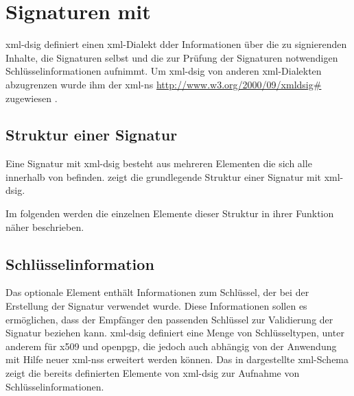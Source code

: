 
\chapter{Signaturen mit }
\label{chap:XML-DSig}
\gls{xml-dsig} definiert einen \gls{xml}-Dialekt dder Informationen über die zu signierenden Inhalte, die Signaturen selbst und die zur Prüfung der Signaturen
notwendigen Schlüsselinformationen aufnimmt. Um \gls{xml-dsig} von anderen \gls{xml}-Dialekten abzugrenzen wurde ihm der \gls{xml-ns}
\url{http://www.w3.org/2000/09/xmldsig#} zugewiesen \cite{xml-dsig:w3c}.

\section{Struktur einer Signatur}
Eine Signatur mit \gls{xml-dsig} besteht aus mehreren Elementen die sich alle innerhalb von  befinden.  zeigt
die grundlegende Struktur einer Signatur mit \gls{xml-dsig}.



Im folgenden werden die einzelnen Elemente dieser Struktur in ihrer Funktion näher beschrieben. 

\section{Schlüsselinformation}
Das optionale Element  enthält Informationen zum Schlüssel, der bei der Erstellung der Signatur verwendet wurde. Diese Informationen sollen es
ermöglichen, dass der Empfänger den passenden Schlüssel zur Validierung der Signatur beziehen kann. \gls{xml-dsig} definiert eine Menge von
Schlüsseltypen, unter anderem für \gls{x509} und \gls{openpgp}, die jedoch auch abhängig von der Anwendung mit Hilfe neuer \glspl{xml-ns} erweitert werden
können. Das in  dargestellte \gls{xml}-Schema zeigt die bereits definierten Elemente von \gls{xml-dsig} zur Aufnahme von
Schlüsselinformationen.



